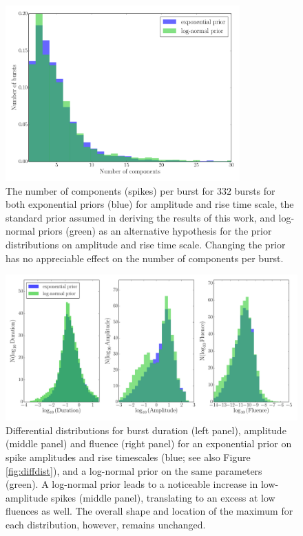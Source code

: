 \documentclass[12pt]{emulateapj}
\begin{document}
 \begin{figure}[htbp]
\begin{center}
\includegraphics[width=9cm]{sgr1550_prior_nspikes.pdf}
\caption{The number of  components (spikes) per burst for $332$ bursts for both exponential priors (blue) for amplitude and rise time scale, the standard prior assumed in
deriving the results of this work, and log-normal priors (green) as an alternative hypothesis for the prior distributions on amplitude and rise time scale. Changing the prior has 
no appreciable effect on the number of components per burst.}
\label{fig:nspikes_prior}
\end{center}
\end{figure}

\begin{figure}[htbp]
\begin{center}
\includegraphics[width=\textwidth]{sgr1550_prior_diff_dist.pdf}
\caption{Differential distributions for burst duration (left panel), amplitude (middle panel) and fluence (right panel) for an exponential prior on spike 
amplitudes and rise timescales (blue; see also Figure \ref{fig:diffdist}),
and a log-normal prior on the same parameters (green). A log-normal prior leads to a noticeable increase in low-amplitude spikes (middle panel), translating
to an excess at low fluences as well. The overall shape and location of the maximum for each distribution, however, remains unchanged.}
\label{fig:diff_prior}
\end{center}
\end{figure}
\end{document}
